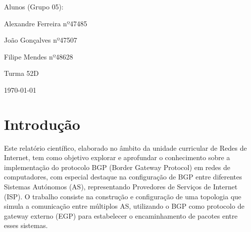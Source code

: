 \documentclass[11pt,english, openright, oneside]{book}
\begin{document}
\begin{titlepage}
\begin{center}
{        \vspace{0.5cm}
              
        Alunos (Grupo 05):
        \par
        Alexandre Ferreira nº47485 
        \par 
        João Gonçalves nº47507
        \par
        Filipe Mendes nº48628
        
        \vspace{0.5cm} 
        Turma 52D
                
        \vspace{1cm}
        {\normalsize \today \par}
	             
	             
	             
	             \par}
	\end{center}
		
	
	
	\pagebreak

\end{titlepage}

\tableofcontents
\pagebreak
\newpage


\begingroup
\let\clearpage\relax
\pagebreak
\listoffigures
\endgroup

\newpage

\begingroup
\let\clearpage\relax
\pagebreak
\listoftables
\endgroup

\newpage

\mainmatter
\chapter{Introdução}
\vspace{0.2cm}

\par Este relatório científico, elaborado no âmbito da unidade curricular de Redes de Internet, tem como objetivo explorar e aprofundar o conhecimento sobre a implementação do protocolo BGP (Border Gateway Protocol) em redes de computadores, com especial destaque na configuração de BGP entre diferentes Sistemas Autónomos (AS), representando Provedores de Serviços de Internet (ISP). O trabalho consiste na construção e configuração de uma topologia que simula a comunicação entre múltiplos AS, utilizando o BGP como protocolo de gateway externo (EGP) para estabelecer o encaminhamento de pacotes entre esses sistemas.
\vspace{0.2cm}
\end{document}
